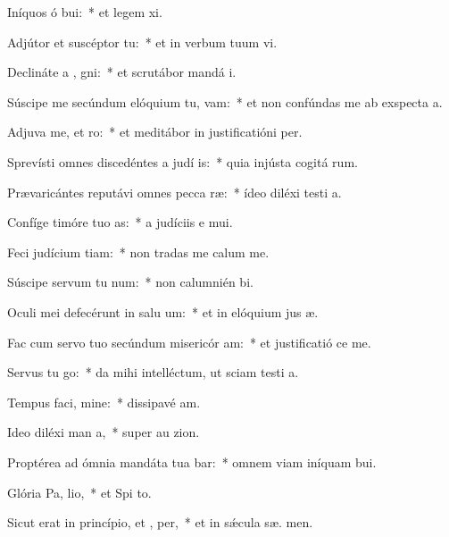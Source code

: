 \item Iníquos ó bui:~* et legem  xi.
\item Adjútor et suscéptor   tu:~* et in verbum tuum vi.
\item Declináte a , gni:~* et scrutábor mandá  i.
\item Súscipe me secúndum elóquium tu,  vam:~* et non confúndas me ab exspecta a.
\item Adjuva me, et  ro:~* et meditábor in justificatióni  per.
\item Sprevísti omnes discedéntes a judí is:~* quia injústa cogitá rum.
\item Prævaricántes reputávi omnes pecca ræ:~* ídeo diléxi testi a.
\item Confíge timóre tuo  as:~* a judíciis e  mui.
\item Feci judícium  tiam:~* non tradas me calum me.
\item Súscipe servum tu  num:~* non calumnién  bi.
\item Oculi mei defecérunt in salu um:~* et in elóquium jus æ.
\item Fac cum servo tuo secúndum misericór am:~* et justificatió  ce me.
\item Servus tu  go:~* da mihi intelléctum, ut sciam testi a.
\item Tempus faci, mine:~* dissipavé  am.
\item Ideo diléxi man a,~* super au  zion.
\item Proptérea ad ómnia mandáta tua bar:~* omnem viam iníquam  bui.
\item Glória Pa,  lio,~* et Spi to.
\item Sicut erat in princípio, et ,  per,~* et in sǽcula sæ. men.
